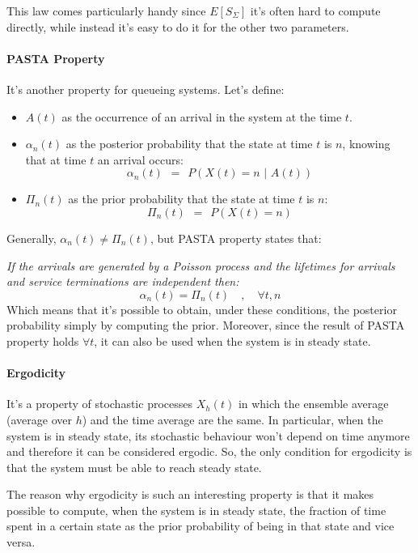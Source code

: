 \documentclass[12pt,a4paper]{article}
\begin{document}
\bigskip \noindent
This law comes particularly handy since $E[S_{\Sigma}]$ it's often hard to compute directly, while instead it's easy to do it for the other two parameters.
\paragraph{PASTA Property}
It's another property for queueing systems. Let's define:
\begin{itemize}
\item $A(t)$ as the occurrence of an arrival in the system at the time $t$.
\item $\alpha_n(t)$ as the posterior probability that the state at time $t$ is $n$, knowing that at time $t$ an arrival occurs:
$$
\alpha_n(t)
\hspace{5pt}=\hspace{5pt}
P(X(t)=n \hspace{4pt} | \hspace{4pt} A(t))
$$
\item $\Pi_n(t)$ as the prior probability that the state at time $t$ is $n$:
$$
\Pi_n(t)
\hspace{5pt}=\hspace{5pt}
P(X(t)=n)
$$
\end{itemize}
Generally, $\alpha_n(t)\neq \Pi_n(t)$, but PASTA property states that:

\bigskip\noindent
\emph{If the arrivals are generated by a Poisson process and the lifetimes for arrivals and service terminations are independent then:}
$$
\alpha_n(t) = \Pi_n(t) \quad,\quad \forall t,n
$$
Which means that it's possible to obtain, under these conditions, the posterior probability simply by computing the prior. Moreover, since the result of PASTA property holds $\forall t$, it can also be used when the system is in steady state.
\newpage

\paragraph{Ergodicity}
It's a property of stochastic processes $X_h(t)$ in which the ensemble average (average over $h$) and the time average are the same. In particular, when the system is in steady state, its stochastic behaviour won't depend on time anymore and therefore it can be considered ergodic. So, the only condition for ergodicity is that the system must be able to reach steady state.

\bigskip \noindent
The reason why ergodicity is such an interesting property is that it makes possible to compute, when the system is in steady state, the fraction of time spent in a certain state as the prior probability of being in that state and vice versa.
\end{document}
